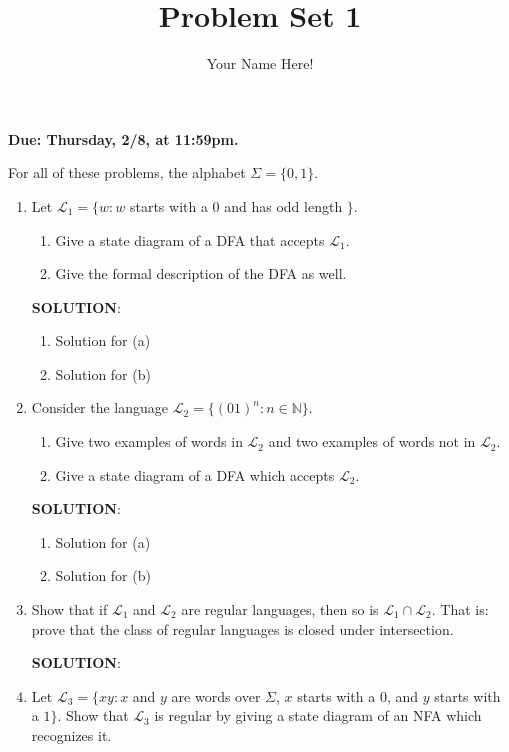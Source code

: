 \documentclass[12pt]{article}
\title{Problem Set 1}
\author{Your Name Here!}
\date{}
\newcommand{\sol}{\par{\bf SOLUTION}: }
\begin{document}
\maketitle

\noindent
    {\bf Due: Thursday, 2/8, at 11:59pm. }
        
For all of these problems, the alphabet $\Sigma = \{ 0, 1 \}$.
    
\begin{enumerate}
\item Let $\mathcal{L}_1 = \{ w : w$ starts with a 0 and has odd length $\}$.
    \begin{enumerate}
    \item Give a state diagram of a DFA that accepts $\mathcal{L}_1$.
    \item Give the formal description of the DFA as well.
    \end{enumerate} 

\sol %
\begin{enumerate}
	\item Solution for (a)
	\item Solution for (b)
\end{enumerate}
    
\item Consider the language $\mathcal{L}_2 = \{ (01)^n : n \in \mathbb{N} \}$.
\begin{enumerate}
	\item Give two examples of words in $\mathcal{L}_2$ and two examples of words not in $\mathcal{L}_2$.
	\item Give a state diagram of a DFA which accepts $\mathcal{L}_2$.
\end{enumerate}

\sol %
\begin{enumerate}
	\item Solution for (a)
	\item Solution for (b)
\end{enumerate}

\item Show that if $\mathcal{L}_1$ and $\mathcal{L}_2$ are regular languages, then so is $\mathcal{L}_1 \cap \mathcal{L}_2$. That is: prove that the class of regular languages is closed under intersection.

\sol %


\item \label{l4} Let $\mathcal{L}_3 = \{ xy : x$ and $y$ are words over $\Sigma$, $x$ starts with a $0$, and $y$ starts with a $1 \}.$ Show that $\mathcal{L}_3$ is regular by giving a state diagram of an NFA which recognizes it.


\end{enumerate}
\end{document}
